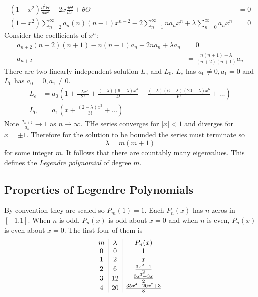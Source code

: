 \documentclass[a4paper]{article}
\begin{document}
\begin{align*}
  (1 - x^2) \frac{d^2\Theta}{dx^2} - 2x \frac{d\Theta}{dx} + \theta \Theta &= 0 \\
  (1 -x^2) \sum_{n = 2}^{\infty} a_n(n)(n - 1) x^{n-2} - 2 \sum_{n = 1}^{\infty}n a_n x^n + \lambda \sum_{n = 0}^{\infty} a_n x^n &= 0
\end{align*}
Consider the coefficients of \(x^n\):
\begin{align*}
  a_{n + 2} (n + 2)(n + 1) - n(n - 1) a_n - 2 n a_n + \lambda a_n &= 0 \\
  a_{n + 2} &= \frac{n(n + 1) - \lambda}{(n + 2)(n + 1)} a_n
\end{align*}
There are two linearly independent solution \(L_e\) and \(L_0\), \(L_e\) has \(a_0 \neq 0, a_1 = 0\) and \(L_0\) has \(a_0 = 0, a_1 \neq 0\).
\begin{align*}
  L_e &= a_0 \left( 1 + \frac{-\lambda x^2}{2!} + \frac{(-\lambda)(6 - \lambda) x^4}{4!} + \frac{(-\lambda)(6 - \lambda)(20 - \lambda)x^6}{6!} + \dots \right) \\
  L_0 &= a_1 \left( x + \frac{(2 - \lambda)x^3}{3!} + \dots \right)
\end{align*}
Note \(\frac{a_{n + 2}}{a_n} \to 1\) as \(n \to \infty\). THe series converges for \(|x| < 1\) and diverges for \(x = \pm 1\). Therefore for the solution to be bounded the series must terminate so
\[
  \lambda = m(m + 1)
\]
for some integer \(m\). It follows that there are countably many eigenvalues. This defines the \emph{Legendre polynomial} of degree \(m\).

\subsection{Properties of Legendre Polynomials}

By convention they are scaled so \(P_m(1) = 1\). Each  \(P_n(x)\) has \(n\) zeros in \([-1. 1]\). When \(n\) is odd, \(P_n(x)\) is odd about \(x = 0\) and when \(n\) is even, \(P_n(x)\) is even about \(x = 0\). The first four of them is
\[
\begin{array}[h]{c|c|c}
  m & \lambda & P_n(x) \\
  0 & 0 & 1 \\
  1 & 2 & x \\
  2 & 6 & \frac{3x^2 - 1}{2} \\
  3 & 12 & \frac{5x^3 - 3x}{2} \\
  4 & 20 & \frac{35x^4 - 20x^2 + 3}{8}
\end{array}
\]
\end{document}
